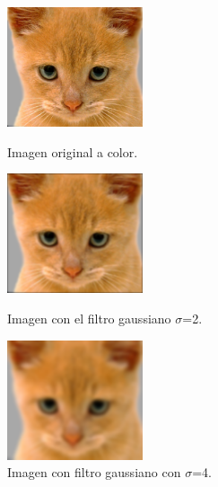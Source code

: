 \documentclass[12pt]{article}
\begin{document}
\begin{figure}[H]
\centering
\parbox{4cm}{
\includegraphics[width=4cm]{images/OriginalCat.png}
\caption{Imagen original a color.}
\label{fig:2figsA}}
\qquad
\begin{minipage}{4cm}
\includegraphics[width=4cm]{images/GaussianCat.png}
\caption{Imagen con el filtro gaussiano $\sigma$=2.}
\label{fig:2figsB}
\end{minipage}
\qquad
\begin{minipage}{4cm}
\includegraphics[width=4cm]{images/GaussianCatBigSigma.png}
\caption{Imagen con filtro gaussiano con $\sigma$=4.}
\label{fig:2figsB}
\end{minipage}
\end{figure}
\end{document}
